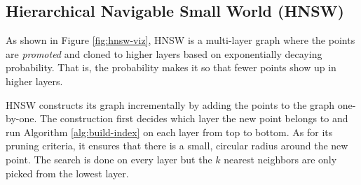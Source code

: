\subsection{Hierarchical Navigable Small World (HNSW)}

As shown in Figure \ref{fig:hnsw-viz}, HNSW is a multi-layer graph where the points are \textit{promoted} and cloned to higher layers based on exponentially decaying probability. That is, the probability makes it so that fewer points show up in higher layers.

HNSW constructs its graph incrementally by adding the points to the graph one-by-one. The construction first decides which layer the new point belongs to and run Algorithm \ref{alg:build-index} on each layer from top to bottom. As for its pruning criteria, it ensures that there is a small, circular radius around the new point. The search is done on every layer but the \(k\) nearest neighbors are only picked from the lowest layer.






